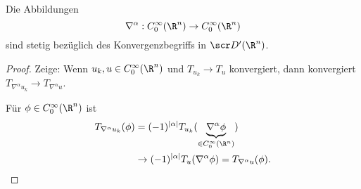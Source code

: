 \begin{st} \label{5.12}
	Die Abbildungen
	\[
		\nabla^\alpha : C_0^\infty(\R^n) \to C_0^\infty(\R^n)
	\]
	sind stetig bezüglich des Konvergenzbegriffs in $\scr D'(\R^n)$.
	\begin{proof}
		Zeige: Wenn $u_k, u \in C_0^\infty(\R^n)$ und $T_{u_k} \to T_u$ konvergiert, dann konvergiert $T_{\nabla^\alpha u_k} \to T_{\nabla^\alpha u}$.

		Für $\phi \in C_0^\infty(\R^n)$ ist
		\begin{align*}
			T_{\nabla^\alpha u_k} (\phi) 
			&= (-1)^{|\alpha|} T_{u_k} (\underbrace{\nabla^\alpha \phi}_{\in C_0^\infty(\R^n)}) \\
			&\to (-1)^{|\alpha|} T_u(\nabla^\alpha \phi)
			= T_{\nabla^\alpha u}(\phi).
		\end{align*}
	\end{proof}
\end{st}


